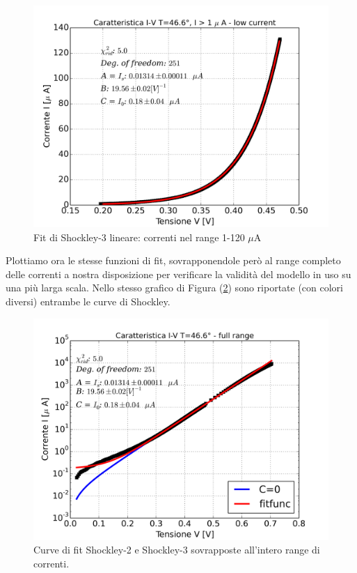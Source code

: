 \documentclass[a4paper]{article}
\begin{document}
\begin{figure}
\centering
\includegraphics[width=0.9\linewidth]{./shockley_3_pars_46gradi}
\caption{Fit di Shockley-3 lineare: correnti nel range 1-120 $\mu$A}
\label{fig:shockley_3_pars_46gradi}
\end{figure}

Plottiamo ora le stesse funzioni di fit, sovrapponendole però al range completo delle correnti a nostra disposizione per verificare la validità del modello in uso su una più larga scala. Nello stesso grafico di Figura (\ref{fig:shockley_46_6_fullcur_visualiz}) sono riportate (con colori diversi) entrambe le curve di Shockley.

\begin{figure}
\centering
\includegraphics[width=0.9\linewidth]{./shockley_46_6_fullcur_visualiz}
\caption{Curve di fit Shockley-2 e Shockley-3 sovrapposte all'intero range di correnti.}
\label{fig:shockley_46_6_fullcur_visualiz}
\end{figure}
\end{document}
